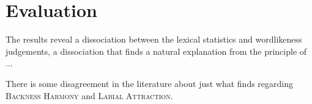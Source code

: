 \section{Evaluation}

The results reveal a dissociation between the lexical statistics and wordlikeness judgements, a dissociation that finds a natural explanation from the principle of ...

There is some disagreement in the literature about just what \citet{Zimmer1969} finds regarding \textsc{Backness Harmony} and \textsc{Labial Attraction}.





